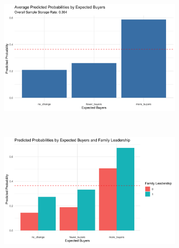 \documentclass[12pt]{article}
\begin{document}
\begin{figure}[htbp]
    \centering
    \begin{subfigure}{\textwidth}
        \centering
        \includegraphics[height=0.28\textheight]{figures/overall_predicted_probs.png}
        \caption{}
    \end{subfigure}\\[2mm]
    
    \begin{subfigure}{\textwidth}
        \centering
        \includegraphics[height=0.28\textheight]{figures/predicted_probs_by_family.png}
        \caption{}
    \end{subfigure}\\[2mm]


\end{figure}
\end{document}
